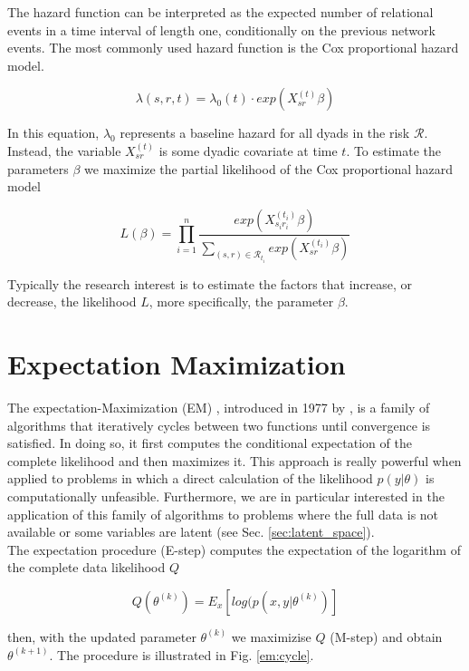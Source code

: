 \documentclass[mscthesis]{usiinfthesis}
\begin{document}
The hazard function can be interpreted as the expected number of relational events in a time interval of length one, conditionally on the previous network events. The most commonly used hazard function is the Cox proportional hazard model. 


\[
\lambda(s, r, t) = \lambda_0(t) \cdot exp({X_{sr}^{(t)} \beta} )
\]

In this equation, $\lambda_0$ represents a baseline hazard for all dyads in the risk $\mathcal{R}$. Instead, the variable $X_{sr}^{(t)}$ is some dyadic covariate at time $t$. To estimate the parameters $\beta$ we maximize the partial likelihood of the Cox proportional hazard model 


\[
L(\beta) =  \prod_{i=1}^n \frac{exp (X_{s_i r_i}^{(t_i)} \beta) }{ \sum_{(s,r) \in \mathcal{R}_{t_i}} exp({X_{sr}^{(t_i)} \beta} )}
\]

Typically the research interest is to estimate the factors that increase, or decrease, the likelihood $L$, more specifically, the parameter $\beta$.


\section{Expectation Maximization}
\label{sec:em}

The expectation-Maximization (EM) , introduced in 1977 by \citet{paper:dempster}, is a family of algorithms that iteratively cycles between two functions until convergence is satisfied. In doing so, it first computes the conditional expectation of the complete likelihood and then maximizes it. This approach is really powerful when applied to problems in which a direct calculation of the likelihood $p(y|\theta)$ is computationally unfeasible. Furthermore, we are in particular interested in the application of this family of algorithms to problems where the full data is not available or some variables are latent (see Sec. \ref{sec:latent_space}). \\

The expectation procedure (E-step) computes the expectation of the logarithm of the complete data likelihood $Q$

\[
Q(\theta^{(k)}) = E_{x} \left[ log(p(x, y | \theta^{(k)}) \right]
\]

then, with the updated parameter $\theta^{(k)}$ we maximizise $Q$ (M-step) and obtain $\theta^{(k+1)}$. The procedure is illustrated in Fig. \ref{em:cycle}. 
\end{document}
